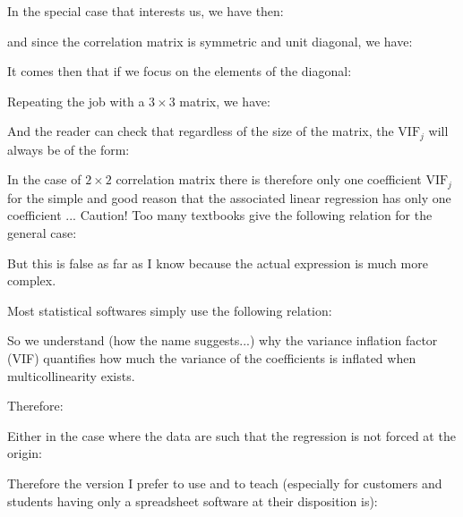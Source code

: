 	In the special case that interests us, we have then:
	
	and since the correlation matrix is symmetric and unit diagonal, we have:
	
	It comes then that if we focus on the elements of the diagonal:
	
	Repeating the job with a $3\times 3$ matrix, we have:
	
	And the reader can check that regardless of the size of the matrix, the $\text{VIF}_j$ will always be of the form:
	
	In the case of $2\times 2$ correlation matrix there is therefore only one coefficient $\text{VIF}_j$ for the simple and good reason that the associated linear regression has only one coefficient ... Caution! Too many textbooks give the following relation for the general case:
	
	But this is false as far as I know because the actual expression is much more complex. 

	Most statistical softwares simply use the following relation:
	
	So we understand (how the name suggests...) why the variance inflation factor (VIF) quantifies how much the variance of the coefficients is inflated when multicollinearity exists.
	
	Therefore:
	
	Either in the case where the data are such that the regression is not forced at the origin:
	
	Therefore the version I prefer to use and to teach (especially for customers and students having only a spreadsheet software at their disposition is):
	
